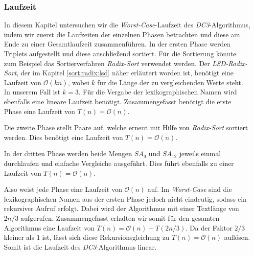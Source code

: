 \subsubsection{Laufzeit}
\label{dc3:algorithmus:laufzeit}

In diesem Kapitel untersuchen wir die \emph{Worst-Case}-Laufzeit des \emph{DC3}-Al\-go\-rith\-mus, indem wir zuerst die Laufzeiten der einzelnen Phasen betrachten und diese am Ende zu einer Gesamtlaufzeit zusammenführen.
In der ersten Phase werden Triplets aufgestellt und diese anschließend sortiert. Für die Sortierung könnte zum Beispiel das Sortierverfahren \emph{Radix-Sort} verwendet werden. Der \emph{LSD-Radix-Sort}, der im Kapitel \ref{sort:radix:lsd} näher erläutert worden ist, benötigt eine Laufzeit von $\mathcal{O}(kn)$, wobei $k$ für die Länge der zu ver\-gleich\-en\-den Werte steht. In unserem Fall ist $k = 3$. Für die Vergabe der lexikographischen Namen wird ebenfalls eine lineare Laufzeit benötigt. Zusammengefasst benötigt die erste Phase eine Laufzeit von $T(n) = \mathcal{O}(n)$.

Die zweite Phase stellt Paare auf, welche erneut mit Hilfe von \emph{Radix-Sort} sortiert werden. Dies benötigt eine Laufzeit von $T(n) = \mathcal{O}(n)$.

In der dritten Phase werden beide Mengen $SA_{0}$ und $SA_{12}$ jeweils einmal durchlaufen und einfache Vergleiche ausgeführt. Dies führt ebenfalls zu einer Laufzeit von $T(n) = \mathcal{O}(n)$.

Also weist jede Phase eine Laufzeit von $\mathcal{O}(n)$ auf. Im \emph{Worst-Case} sind die lexikographischen Namen aus der ersten Phase jedoch nicht eindeutig, sodass ein rekursiver Aufruf erfolgt. Dabei wird der Algorithmus mit einer Textlänge von $2n/3$ aufgerufen. Zusammengefasst erhalten wir somit für den gesamten Algorithmus eine Laufzeit von $T(n) = \mathcal{O}(n) + T(2n/3)$. Da der Faktor $2/3$ kleiner als $1$ ist, lässt sich diese Rekursionsgleichung zu $T(n) = \mathcal{O}(n)$ auflösen. Somit ist die Laufzeit des \emph{DC3}-Algorithmus linear.